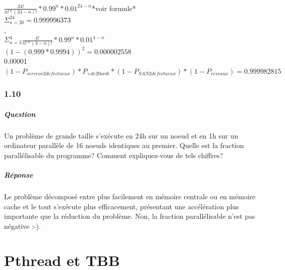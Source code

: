 \documentclass[oneside]{book}
\begin{document}
\\

$\frac{24!}{n! * (24-n)!} * 0.99^{n} * 0.01^{24-n} $*voir formule*\\

$\Sigma_{n=20}^{24} = 0.999996373$\\

,\\

$\Sigma_{n=3}^4 \frac{4!}{n!*(4-n)!} * 0.99^n * 0.01^{4-n}$\\

$(1-(0.999*0.9994))^2 = 0.000002558$\\

0.00001\\

 $(1-P_{serveur2defectueux}) * P_{+de20ordi} * (1-P_{SAN2defectueux}) * (1-P_{reseaux}) = 0.999982815$

\subsection{1.10}
\paragraph{Question}
Un problème de grande taille s'exécute en 24h sur un noeud et en 1h sur un
ordinateur parallèle de 16 noeuds identiques au premier. Quelle est la fraction
parallélisable du programme? Comment expliquez-vous de tels chiffres?
\paragraph{Réponse}
Le problème décomposé entre plus facilement en mémoire centrale ou en
mémoire cache et le tout s'exécute plus efficacement, présentant une
accélération plus importante que la réduction du problème. Non, la fraction
parallélisable n'est pas négative :-).
\chapter{Pthread et TBB}
\end{document}
